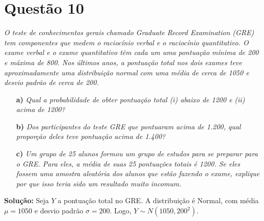 \documentclass[12pt, a4paper]{article}
\begin{document}
\section*{Questão 10}
\textit{O teste de conhecimentos gerais chamado Graduate Record Examination (GRE) tem componentes que medem o raciocínio verbal e o raciocínio quantitativo. O exame verbal e o exame quantitativo têm cada um uma pontuação mínima de 200 e máxima de 800. Nos últimos anos, a pontuação total nos dois exames teve aproximadamente uma distribuição normal com uma média de cerca de 1050 e desvio padrão de cerca de 200.}
\begin{itemize}
    \item[\textbf{a)}] \textit{Qual a probabilidade de obter pontuação total (i) abaixo de 1200 e (ii) acima de 1200?}
    \item[\textbf{b)}] \textit{Dos participantes do teste GRE que pontuaram acima de 1.200, qual proporção deles teve pontuação acima de 1.400?}
    \item[\textbf{c)}] \textit{Um grupo de 25 alunos formou um grupo de estudos para se preparar para o GRE. Para eles, a média de suas 25 pontuações totais é 1200. Se eles fossem uma amostra aleatória dos alunos que estão fazendo o exame, explique por que isso teria sido um resultado muito incomum.}
\end{itemize}

\textbf{Solução:}
Seja $Y$ a pontuação total no GRE. A distribuição é Normal, com média $\mu = 1050$ e desvio padrão $\sigma = 200$. Logo, $Y \sim N(1050, 200^2)$.
\end{document}
